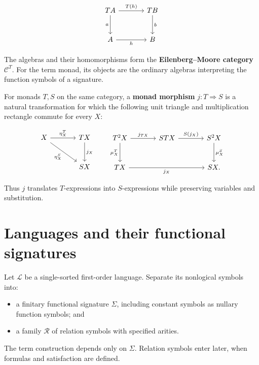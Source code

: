 \documentclass[11pt]{article}
\newcommand{\tightlist}{\setlength{\itemsep}{0pt}%
  \setlength{\parskip}{0pt}}
\theoremstyle{definition}
\begin{document}
\[
\begin{tikzcd}[row sep=large,column sep=large]
T A \arrow[r,"T(h)"] \arrow[d,"a"'] & T B \arrow[d,"b"] \\
A \arrow[r,"h"'] & B
\end{tikzcd}
\]

The algebras and their homomorphisms form the
\textbf{Eilenberg--Moore category} \(\mathcal C^T\). For the term monad, its
objects are the ordinary algebras interpreting the function symbols of a
signature.

For monads \(T,S\) on the same category, a \textbf{monad morphism}
\(j:T\Rightarrow S\) is a natural transformation for which the following
unit triangle and multiplication rectangle commute for every \(X\):

\[
\begin{tikzcd}[row sep=large,column sep=large]
X \arrow[r,"\eta_X^T"] \arrow[dr,"\eta_X^S"'] &
T X \arrow[d,"j_X"] \\
& S X
\end{tikzcd}
\qquad
\begin{tikzcd}[row sep=large,column sep=large]
T^2X \arrow[r,"j_{T X}"] \arrow[d,"\mu_X^T"'] &
S T X \arrow[r,"S(j_X)"] & S^2X \arrow[d,"\mu_X^S"] \\
T X \arrow[rr,"j_X"'] && S X.
\end{tikzcd}
\]

Thus \(j\) translates \(T\)-expressions into \(S\)-expressions while
preserving variables and substitution.

\section{Languages and their functional
signatures}\label{languages-and-their-functional-signatures}

Let \(\mathcal L\) be a single-sorted first-order language. Separate its
nonlogical symbols into:

\begin{itemize}
\tightlist
\item
  a finitary functional signature \(\Sigma\), including constant symbols
  as nullary function symbols; and
\item
  a family \(\mathcal R\) of relation symbols with specified arities.
\end{itemize}

The term construction depends only on \(\Sigma\). Relation symbols enter
later, when formulas and satisfaction are defined.
\end{document}
